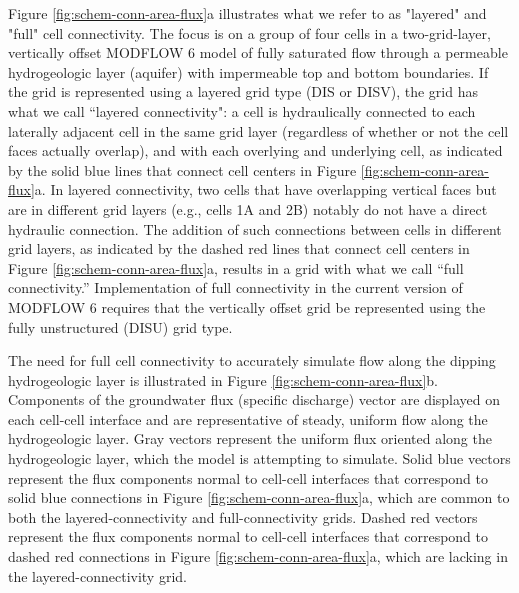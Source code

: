\documentclass{article}
\begin{document}
Figure \ref{fig:schem-conn-area-flux}a illustrates what we refer to as "layered" and "full" cell connectivity. The focus is on a group of four cells in a two-grid-layer, vertically offset MODFLOW 6 model of fully saturated flow through a permeable hydrogeologic layer (aquifer) with impermeable top and bottom boundaries. If the grid is represented using a layered grid type (DIS or DISV), the grid has what we call ``layered connectivity": a cell is hydraulically connected to each laterally adjacent cell in the same grid layer (regardless of whether or not the cell faces actually overlap), and with each overlying and underlying cell, as indicated by the solid blue lines that connect cell centers in Figure \ref{fig:schem-conn-area-flux}a. In layered connectivity, two cells that have overlapping vertical faces but are in different grid layers (e.g., cells 1A and 2B) notably do not have a direct hydraulic connection. The addition of such connections between cells in different grid layers, as indicated by the dashed red lines that connect cell centers in Figure \ref{fig:schem-conn-area-flux}a, results in a grid with what we call ``full connectivity.''  Implementation of full connectivity in the current version of MODFLOW 6 \citep{modflow650software} requires that the vertically offset grid be represented using the fully unstructured (DISU) grid type.

The need for full cell connectivity to accurately simulate flow along the dipping hydrogeologic layer is illustrated in Figure \ref{fig:schem-conn-area-flux}b. Components of the groundwater flux (specific discharge) vector are displayed on each cell-cell interface and are representative of steady, uniform flow along the hydrogeologic layer. Gray vectors represent the uniform flux oriented along the hydrogeologic layer, which the model is attempting to simulate. Solid blue vectors represent the flux components normal to cell-cell interfaces that correspond to solid blue connections in Figure \ref{fig:schem-conn-area-flux}a, which are common to both the layered-connectivity and full-connectivity grids. Dashed red vectors represent the flux components normal to cell-cell interfaces that correspond to dashed red connections in Figure \ref{fig:schem-conn-area-flux}a, which are lacking in the layered-connectivity grid.
\end{document}
